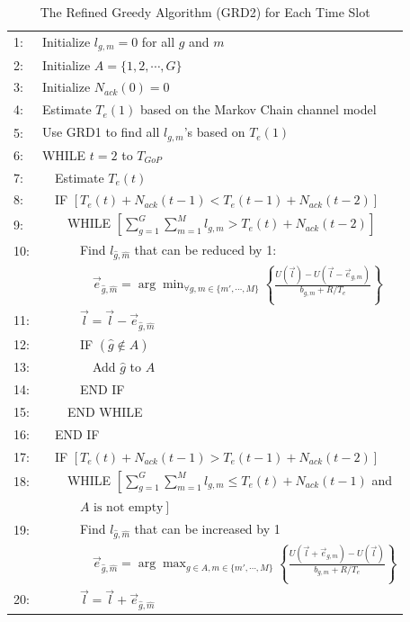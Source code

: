 \documentclass[12pt,onecolumn,draftclsnofoot]{IEEEtran} %
\begin{document}
\begin{table} [!t]
\begin{center}
\caption{The Refined Greedy Algorithm (GRD2) for Each Time Slot}
\begin{tabular}{ll}
\hline
1: & Initialize $l_{g,m}=0$ for all $g$ and $m$ \\
2: & Initialize $A=\{1,2,\cdots,G\}$\\
3: & Initialize $N_{ack}(0)=0$ \\
4: & Estimate $T_e(1)$ based on the Markov Chain channel model \\
5: & Use GRD1 to find all $l_{g,m}$'s based on $T_e(1)$ \\
6: & WHILE $t=2$ to $T_{GoP}$ \\
7: & \ \ Estimate $T_e(t)$ \\
8: & \ \ IF $\left[ T_e(t)+N_{ack}(t-1) < T_e(t-1)+N_{ack}(t-2) \right]$ \\
9: & \ \ \ \ WHILE $\left[ \sum_{g=1}^G\sum_{m=1}^Ml_{g,m} > T_e(t)+N_{ack}(t-2) \right]$ \\
10: & \ \ \ \ \ \ Find $l_{\hat{g},\hat{m}}$ that can be reduced by 1: \\
  & \ \ \ \ \ \ \ \ $\vec{e}_{\hat{g},\hat{m}}=\arg \min_{\forall g, m \in \{m',\cdots,M\}} \left\{\frac{U(\vec{l})-U(\vec{l}-\vec{e}_{g,m})}{b_{g,m}+R/T_e} \right\}$ \\
11: & \ \ \ \ \ \ $\vec{l}=\vec{l}-\vec{e}_{\hat{g},\hat{m}}$ \\
12: & \ \ \ \ \ \ IF $(\hat{g} \notin A)$\\
13: & \ \ \ \ \ \ \ \ Add $\hat{g}$ to $A$\\
14: & \ \ \ \ \ \ END IF \\
15: & \ \ \ \ END WHILE \\
16: & \ \ END IF \\
17: & \ \ IF $\left[ T_e(t)+N_{ack}(t-1) > T_e(t-1)+N_{ack}(t-2) \right]$ \\
18: & \ \ \ \ WHILE $\left[ \sum_{g=1}^G\sum_{m=1}^Ml_{g,m} \le T_e(t)+N_{ack}(t-1) \right.$ and \\
    & \ \ \ \ \ \  $\left. A \mbox{ is not empty} \right]$ \\
19: & \ \ \ \ \ \ Find $l_{\hat{g},\hat{m}}$ that can be increased by 1 \\
    & \ \ \ \ \ \ \ \ $\vec{e}_{\hat{g},\hat{m}}=\arg \max_{g \in A,m \in \{m',\cdots,M\}} \left\{\frac{U(\vec{l}+\vec{e}_{g,m})-U(\vec{l})}{b_{g,m}+R/T_e} \right\}$ \\
20: & \ \ \ \ \ \ $\vec{l}=\vec{l}+\vec{e}_{\hat{g},\hat{m}}$                             \\

\end{tabular}
\end{center}
\end{table}
\end{document}
